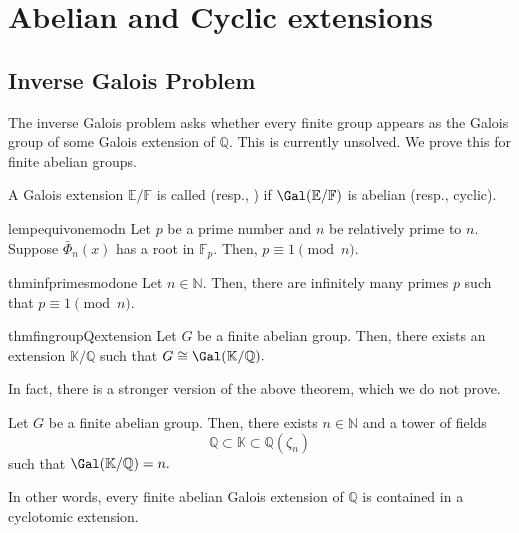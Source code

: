 \chapter{Abelian and Cyclic extensions}

\section{Inverse Galois Problem}
The inverse Galois problem asks whether every finite group appears as the Galois group of some Galois extension of $\mathbb{Q}.$ This is currently unsolved. We prove this for finite abelian groups.

\begin{defn}%
	A Galois extension $\mathbb{E}/\mathbb{F}$ is called  (resp., ) if $\Gal(\mathbb{E}/\mathbb{F})$ is abelian (resp., cyclic).
\end{defn}

\begin{restatable}[]{lem}{pequivonemodn}
\label{lem:pequivonemodn}
	Let $p$ be a prime number and $n$ be relatively prime to $n.$ Suppose $\bar{\Phi}_n(x)$ has a root in $\mathbb{F}_p.$ Then, $p \equiv 1 \pmod{n}.$ \hfill\hyperref[lem:pequivonemodn2]{\downsym}
\end{restatable}

\begin{restatable}[]{thm}{infprimesmodone}
\label{thm:infprimesmodone}
	Let $n \in \mathbb{N}.$ Then, there are infinitely many primes $p$ such that $p \equiv 1 \pmod{n}.$ \hfill\hyperref[thm:infprimesmodone2]{\downsym}
\end{restatable}

\begin{restatable}[]{thm}{fingroupQextension}
\label{thm:fingroupQextension}
	Let $G$ be a finite abelian group. Then, there exists an extension $\mathbb{K}/\mathbb{Q}$ such that $G \cong \Gal(\mathbb{K}/\mathbb{Q}).$ \hfill\hyperref[thm:fingroupQextension2]{\downsym}
\end{restatable}

In fact, there is a stronger version of the above theorem, which we do not prove.

\begin{thm}
	Let $G$ be a finite abelian group. Then, there exists $n \in \mathbb{N}$ and a tower of fields
	\begin{equation*} 
		\mathbb{Q} \subset \mathbb{K} \subset \mathbb{Q}(\zeta_n)
	\end{equation*}
	such that $\Gal(\mathbb{K}/\mathbb{Q}) = n.$

	In other words, every finite abelian Galois extension of $\mathbb{Q}$ is contained in a cyclotomic extension.
\end{thm}

